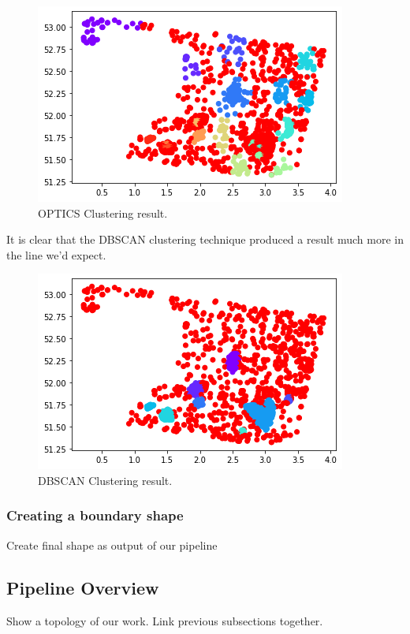 \begin{figure}[ht]
\begin{center}
\centerline{\includegraphics[width=\columnwidth]{images/cluster_optics.png}}
\caption{OPTICS Clustering result.}
\label{OPTICS Clustering}
\end{center}
\end{figure}

It is clear that the DBSCAN clustering technique produced a result much more in the line we'd expect. 

\begin{figure}[ht]
\begin{center}
\centerline{\includegraphics[width=\columnwidth]{images/cluster_dbscan.png}}
\caption{DBSCAN Clustering result.}
\label{DBSCAN Clustering}
\end{center}
\end{figure}

\subsubsection{Creating a boundary shape}

Create final shape as output of our pipeline

\subsection{Pipeline Overview}

Show a topology of our work. Link previous subsections together.

